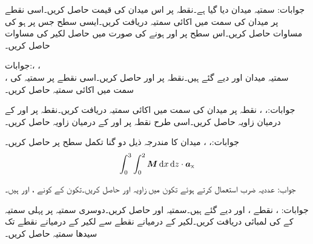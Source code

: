 جوابات:
سمتیہ میدان  دیا گیا ہے۔نقطہ  پر اس میدان کی قیمت حاصل کریں۔اسی نقطے پر میدان کی سمت میں اکائی سمتیہ دریافت کریں۔ایسی سطح جس پر  ہو کی مساوات حاصل کریں۔اس سطح پر  اور  ہونے کی صورت میں حاصل لکیر کی مساوات حاصل کریں۔

جوابات:، ، \\ ، 
سمتیہ میدان  اور  دیے گئے ہیں۔نقطہ  پر  اور  حاصل کریں۔اسی نقطے پر سمتیہ  کی سمت میں اکائی سمتیہ حاصل کریں۔

جوابات:، ، 
 نقطہ  پر میدان  کی سمت میں اکائی سمتیہ  دریافت کریں۔نقطہ  پر  اور  کے درمیان زاویہ حاصل کریں۔اسی طرح نقطہ  پر  اور  کے درمیان زاویہ حاصل کریں۔

جوابات:، ، 
میدان  کا مندرجہ ذیل دو گنا تکمل  سطح پر حاصل کریں۔
\begin{align*}
\int_{0}^{3} \int_{0}^{2} \kvec{M} \dif x \dif z\cdot \ax 
\end{align*}

جواب: 
عددیہ ضرب استعمال کرتے ہوئے تکون  میں زاویہ  اور  حاصل کریں۔تکون کے کونے ،  اور
  ہیں۔

جوابات: ، 
نقطے ،  اور  دیے گئے ہیں۔سمتیہ  اور  حاصل کریں۔دوسری سمتیہ  پر  پہلی سمتیہ کے  کی لمبائی دریافت کریں۔لکیر  کے درمیانے نقطے سے لکیر  کے درمیانے نقطے تک سیدھا سمتیہ حاصل کریں۔

